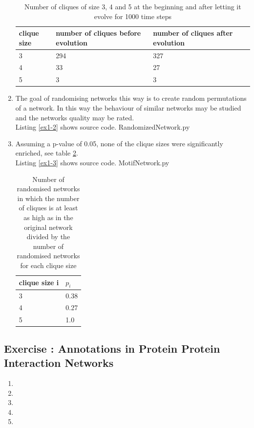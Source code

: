 \documentclass[10pt,a4paper]{article}
\newcommand{\exercise}[1]
{
  \stepcounter{subsection}
  \subsection*{Exercise \thesubsection: #1}

}
\begin{document}
\begin{enumerate}
\begin{table}[!h]
\label{tab2}
\begin{tabular}{llll}
clique size & number of cliques before evolution & number of cliques after evolution\\
\hline
3 & 294 & 327\\
4 & 33 & 27\\
5 & 3 & 3\\
\end{tabular}
\caption{Number of cliques of size 3, 4 and 5 at the beginning and after letting it evolve for 1000 time steps}
\end{table}

\item The goal of randomising networks this way is to create random permutations of a network. In this way the behaviour of similar networks may be studied and the networks quality may be rated.\\
Listing \ref{ex1-2} shows source code.
 {RandomizedNetwork.py}

\item Assuming a p-value of 0.05, none of the clique sizes were significantly enriched, see table \ref{tab3}.\\
Listing \ref{ex1-3} shows source code.
 {MotifNetwork.py}
\begin{table}[!h]
\label{tab3}
\begin{tabular}{ll}
clique size i & $p_i$\\
\hline
3 & 0.38\\
4 & 0.27\\
5 & 1.0\\
\end{tabular}
\caption{Number of randomised networks in which the
number of cliques is at least as high as in the original network divided by the number of randomised networks for each clique size}
\end{table}
\end{enumerate}

\exercise{Annotations in Protein Protein Interaction Networks}
\begin{enumerate}
\item 

\item 

\item 

\item 

\item 
\end{enumerate}
\end{document}
